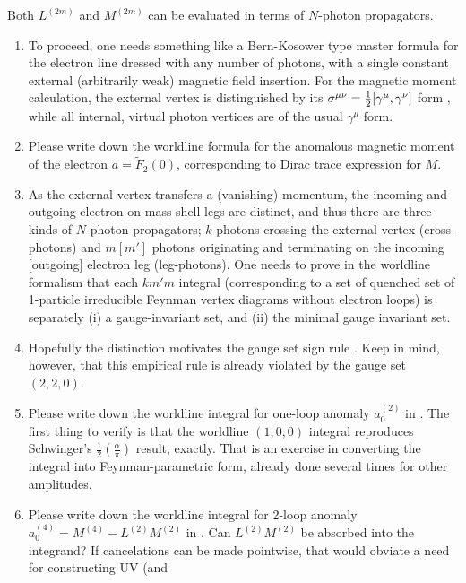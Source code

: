 Both $L^{(2m)}$ and $M^{(2m)}$ can be evaluated in terms of
$N$-photon propagators.

\begin{enumerate}
  \item
To proceed, one needs something like a Bern-Kosower type
master formula for the electron line dressed with any number of photons,
with a single constant external (arbitrarily weak) magnetic field insertion.
For the magnetic moment calculation, the external vertex is distinguished
by its
\(
\sigma^{\mu\nu}={1\over 2}[\gamma^{\mu},\gamma^{\nu}]
\)
form , while all internal, virtual photon vertices
are of the usual $\gamma^{\mu}$ form.
  \item
Please write down
the worldline formula for the anomalous magnetic moment
of the electron $a=\tilde{F}_2(0)$, corresponding to Dirac trace
expression  for $M$.
  \item
As the external vertex transfers a (vanishing) momentum, the
incoming and outgoing electron on-mass shell legs are distinct, and thus
there are three kinds of $N$-photon propagators; $k$ photons crossing the
external vertex (cross-photons) and $m [m']$ photons originating and
terminating on the incoming [outgoing] electron leg (leg-photons). One
needs to prove in the worldline formalism that each $km'm$
integral (corresponding to a set of quenched set of 1-particle
irreducible Feynman vertex diagrams without electron loops) is separately
(i) a gauge-invariant set, and
(ii) the minimal gauge invariant set.
  \item
Hopefully the distinction motivates the  gauge set sign rule
. Keep in mind, however, that this empirical rule is
already violated by the gauge set $(2,2,0)$.
  \item
Please write down
the worldline integral for one-loop anomaly $a_{0}^{(2)}$ in
.
The first thing to verify is that the worldline $(1,0,0)$ integral
reproduces Schwinger's $\frac{1}{2}\left(\frac{\alpha}{\pi}\right)$
result, exactly. That is an exercise in converting the
integral into Feynman-parametric form, already done several times for
other amplitudes.
  \item
Please write down the worldline integral for 2-loop anomaly
$a_{0}^{(4)}=M^{(4)}-L^{(2)}M^{(2)}$ in .
Can $L^{(2)}M^{(2)}$ be absorbed into the integrand? If cancelations can
be made pointwise, that would obviate a need for constructing UV  (and

\end{enumerate}
